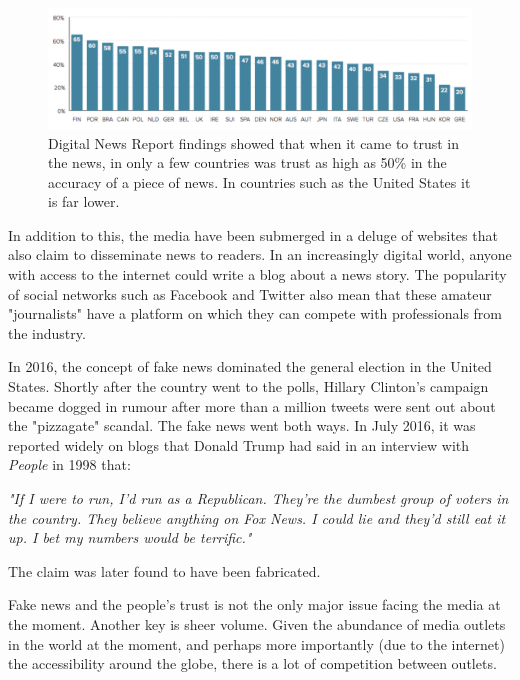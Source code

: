 \documentclass[12pt]{article}
\begin{document}
\begin{figure}[h]
  \centering
    \includegraphics[width=\textwidth]{TrustInNews.png}
   \caption[The Digital News Report 2016 on trust in the news]{Digital News Report findings showed that when it came to trust in the news, in only a few countries was trust as high as 50\% in the accuracy of a piece of news. In countries such as the United States it is far lower.}
   \label{TrustInNews}
\end{figure}

In addition to this, the media have been submerged in a deluge of websites that also claim to disseminate news to readers. In an increasingly digital world, anyone with access to the internet could write a blog about a news story. The popularity of social networks such as Facebook and Twitter also mean that these amateur "journalists" have a platform on which they can compete with professionals from the industry. 

In 2016, the concept of fake news dominated the general election in the United States. Shortly after the country went to the polls, Hillary Clinton's campaign became dogged in rumour after more than a million tweets were sent out about the "pizzagate" scandal. The fake news went both ways. In July 2016, it was reported widely on blogs that Donald Trump had said in an interview with \emph{People} in 1998 that: 

\begin{displayquote}\emph{
"If I were to run, I'd run as a Republican. They're the dumbest group of voters in the country. They believe anything on Fox News. I could lie and they'd still eat it up. I bet my numbers would be terrific."}

\end{displayquote}

The claim was later found to have been fabricated.

Fake news and the people's trust is not the only major issue facing the media at the moment. Another key is sheer volume. Given the abundance of media outlets in the world at the moment, and perhaps more importantly (due to the internet) the accessibility around the globe, there is a lot of competition between outlets. 
\end{document}
